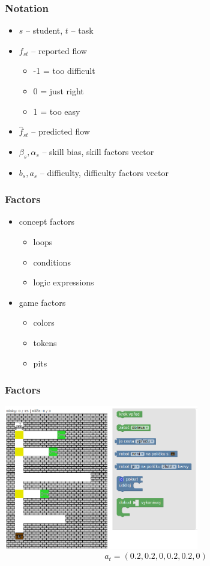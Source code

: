 \documentclass[xcolor=dvipsnames, 14pt]{beamer}
\begin{document}
\begin{frame}
\frametitle{Notation}
\begin{itemize}
\item $s$ -- student, $t$ -- task
\item $f_{st}$ -- reported flow
  \begin{itemize}
  \item -1 = too difficult
  \item 0 = just right
  \item 1 = too easy
  \end{itemize}
\item $\hat{f}_{st}$ -- predicted flow
\item $\beta_s, \alpha_s$ -- skill bias, skill factors vector
\item $b_s, a_s$ -- difficulty, difficulty factors vector
\end{itemize}
\end{frame}

\begin{frame}
\frametitle{Factors}
\begin{itemize}
\item concept factors
  \begin{itemize}
  \item loops
  \item conditions
  \item logic expressions
  \end{itemize}
\item game factors
  \begin{itemize}
  \item colors
  \item tokens
  \item pits
  \end{itemize}
\end{itemize}
\end{frame}

\begin{frame}
\frametitle{Factors}
\centering
\includegraphics[height=6.3cm]{img/task-colors-keys-loops-conditions.png}
\[
  a_t = (0.2, 0.2, 0, 0.2, 0.2, 0)
\]
\end{frame}
\end{document}
